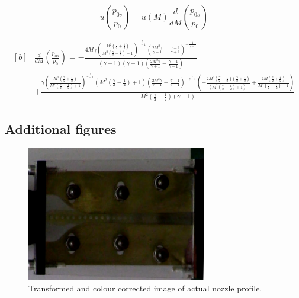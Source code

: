 \documentclass{article}
\begin{document}
\begin{equation}
    u\left( \frac{p_{0s}}{p_0} \right) = u(M) \frac{d}{dM}\left( \frac{p_{0s}}{p_0} \right)
\end{equation}

\begin{equation}
    \begin{aligned}[b]
    & \frac{d}{dM}\left( \frac{p_{0s}}{p_0} \right) = - \frac{4 M \gamma \left(\frac{M^{2} \left(\frac{\gamma}{2} + \frac{1}{2}\right)}{M^{2} \left(\frac{\gamma}{2} - \frac{1}{2}\right) + 1}\right)^{\frac{\gamma}{\gamma - 1}} \left(\frac{2 M^{2} \gamma}{\gamma + 1} - \frac{\gamma - 1}{\gamma + 1}\right)^{- \frac{1}{\gamma - 1}}}{\left(\gamma - 1\right) \left(\gamma + 1\right) \left(\frac{2 M^{2} \gamma}{\gamma + 1} - \frac{\gamma - 1}{\gamma + 1}\right)} \\
    & + \frac{\gamma \left(\frac{M^{2} \left(\frac{\gamma}{2} + \frac{1}{2}\right)}{M^{2} \left(\frac{\gamma}{2} - \frac{1}{2}\right) + 1}\right)^{\frac{\gamma}{\gamma - 1}} \left(M^{2} \left(\frac{\gamma}{2} - \frac{1}{2}\right) + 1\right) \left(\frac{2 M^{2} \gamma}{\gamma + 1} - \frac{\gamma - 1}{\gamma + 1}\right)^{- \frac{1}{\gamma - 1}} \left(- \frac{2 M^{3} \left(\frac{\gamma}{2} - \frac{1}{2}\right) \left(\frac{\gamma}{2} + \frac{1}{2}\right)}{\left(M^{2} \left(\frac{\gamma}{2} - \frac{1}{2}\right) + 1\right)^{2}} + \frac{2 M \left(\frac{\gamma}{2} + \frac{1}{2}\right)}{M^{2} \left(\frac{\gamma}{2} - \frac{1}{2}\right) + 1}\right)}{M^{2} \left(\frac{\gamma}{2} + \frac{1}{2}\right) \left(\gamma - 1\right)}
    \end{aligned}
    \label{eqn:dp0sr_dm}
\end{equation}


\subsection{Additional figures}

\begin{figure}[H]
    \centering
    \includegraphics[width=0.7\textwidth]{actual_nozzle_profile.png}
    \caption{Transformed and colour corrected image of actual nozzle profile.}
    \label{fig:actual_nozzle}
\end{figure}
\end{document}
